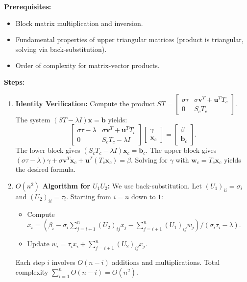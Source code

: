 \begin{solution}
\textbf{Prerequisites:}
\begin{itemize}
    \item Block matrix multiplication and inversion.
    \item Fundamental properties of upper triangular matrices (product is triangular, solving via back-substitution).
    \item Order of complexity for matrix-vector products.
\end{itemize}

\textbf{Steps:}
\begin{enumerate}
    \item \textbf{Identity Verification:} Compute the product $ST = \begin{bmatrix} \sigma \tau & \sigma \mathbf{v}^T + \mathbf{u}^T T_c \\ 0 & S_c T_c \end{bmatrix}$. The system $(ST - \lambda I)\mathbf{x} = \mathbf{b}$ yields:
    \[ \begin{bmatrix} \sigma \tau - \lambda & \sigma \mathbf{v}^T + \mathbf{u}^T T_c \\ 0 & S_c T_c - \lambda I \end{bmatrix} \begin{bmatrix} \gamma \\ \mathbf{x}_c \end{bmatrix} = \begin{bmatrix} \beta \\ \mathbf{b}_c \end{bmatrix}. \]
    The lower block gives $(S_c T_c - \lambda I)\mathbf{x}_c = \mathbf{b}_c$. The upper block gives $(\sigma \tau - \lambda)\gamma + \sigma \mathbf{v}^T \mathbf{x}_c + \mathbf{u}^T (T_c \mathbf{x}_c) = \beta$. Solving for $\gamma$ with $\mathbf{w}_c = T_c \mathbf{x}_c$ yields the desired formula.

    \item \textbf{$O(n^2)$ Algorithm for $U_1 U_2$:} We use back-substitution. Let $(U_1)_{ii} = \sigma_i$ and $(U_2)_{ii} = \tau_i$. Starting from $i=n$ down to $1$:
    \begin{itemize}
        \item Compute $x_i = (\beta_i - \sigma_i \sum_{j=i+1}^n (U_2)_{ij} x_j - \sum_{j=i+1}^n (U_1)_{ij} w_j) / (\sigma_i \tau_i - \lambda)$.
        \item Update $w_i = \tau_i x_i + \sum_{j=i+1}^n (U_2)_{ij} x_j$.
    \end{itemize}
    Each step $i$ involves $O(n-i)$ additions and multiplications. Total complexity $\sum_{i=1}^n O(n-i) = O(n^2)$.


\end{enumerate}
\end{solution}
